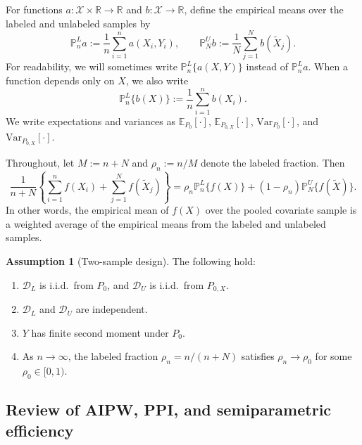 \documentclass{article}
\theoremstyle{plain}
\theoremstyle{definition}
\newtheorem{assumption}{Assumption}
\newcommand{\E}{\mathbb{E}}
\newcommand{\Var}{\mathrm{Var}}
\newcommand{\1}{\mathbbm{1}}
\newcommand{\rhozero}{\rho_0}
\newcommand{\rhon}{\rho_n}
\newcommand{\Pl}{\mathbb{P}^{L}_n}
\newcommand{\Pu}{\mathbb{P}^{U}_N}
\newcommand{\Px}{P_{0,X}}
\begin{document}
For functions \(a:\mathcal X\times\mathbb R\to\mathbb R\) and \(b:\mathcal X\to\mathbb R\), define the empirical means over the labeled and unlabeled samples by
\[
\Pl a := \frac{1}{n}\sum_{i=1}^n a(X_i,Y_i),
\qquad
\Pu b := \frac{1}{N}\sum_{j=1}^N b(\widetilde X_j).
\]
For readability, we will sometimes write \(\Pl\{a(X,Y)\}\) instead of \(\Pl a\). When a function depends only on \(X\), we also write
\[
\Pl\{b(X)\}:=\frac{1}{n}\sum_{i=1}^n b(X_i).
\]
We write expectations and variances as \(\E_{P_0}[\cdot]\), \(\E_{\Px}[\cdot]\), \(\Var_{P_0}[\cdot]\), and \(\Var_{\Px}[\cdot]\).

Throughout, let \(M:=n+N\) and \(\rho_n:=n/M\) denote the labeled fraction. Then
\[
\frac{1}{n+N}\left\{\sum_{i=1}^n f(X_i)+\sum_{j=1}^N f(\widetilde X_j)\right\}
=
\rho_n \Pl\{f(X)\} + (1-\rho_n)\Pu\{f(\widetilde X)\}.
\]
In other words, the empirical mean of \(f(X)\) over the pooled covariate sample is a weighted average of the empirical means from the labeled and unlabeled samples.

\begin{assumption}[Two-sample design]
\label{assump:design}
The following hold:
\begin{enumerate}[leftmargin=6mm,label=(\roman*)]
\item \(\mathcal D_L\) is i.i.d.\ from \(P_0\), and \(\mathcal D_U\) is i.i.d.\ from \(\Px\).
\item \(\mathcal D_L\) and \(\mathcal D_U\) are independent.
\item \(Y\) has finite second moment under \(P_0\).
\item As \(n\to\infty\), the labeled fraction \(\rhon=n/(n+N)\) satisfies \(\rhon\to\rhozero\) for some \(\rhozero\in[0,1)\).
\end{enumerate}
\end{assumption}

\subsection{Review of AIPW, PPI, and semiparametric efficiency}
\label{sec:effreview}
\end{document}

